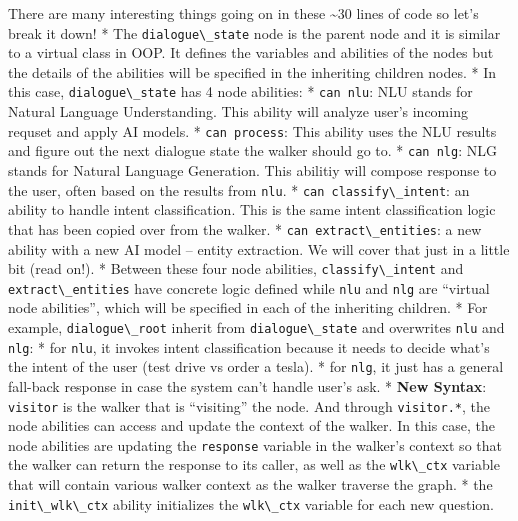 There are many interesting things going on in these \textasciitilde30
lines of code so let's break it down! * The
\passthrough{\lstinline!dialogue\_state!} node is the parent node and it
is similar to a virtual class in OOP. It defines the variables and
abilities of the nodes but the details of the abilities will be
specified in the inheriting children nodes. * In this case,
\passthrough{\lstinline!dialogue\_state!} has 4 node abilities: *
\passthrough{\lstinline!can nlu!}: NLU stands for Natural Language
Understanding. This ability will analyze user's incoming requset and
apply AI models. * \passthrough{\lstinline!can process!}: This ability
uses the NLU results and figure out the next dialogue state the walker
should go to. * \passthrough{\lstinline!can nlg!}: NLG stands for
Natural Language Generation. This abilitiy will compose response to the
user, often based on the results from \passthrough{\lstinline!nlu!}. *
\passthrough{\lstinline!can classify\_intent!}: an ability to handle
intent classification. This is the same intent classification logic that
has been copied over from the walker. *
\passthrough{\lstinline!can extract\_entities!}: a new ability with a
new AI model -- entity extraction. We will cover that just in a little
bit (read on!). * Between these four node abilities,
\passthrough{\lstinline!classify\_intent!} and
\passthrough{\lstinline!extract\_entities!} have concrete logic defined
while \passthrough{\lstinline!nlu!} and \passthrough{\lstinline!nlg!}
are ``virtual node abilities'', which will be specified in each of the
inheriting children. * For example,
\passthrough{\lstinline!dialogue\_root!} inherit from
\passthrough{\lstinline!dialogue\_state!} and overwrites
\passthrough{\lstinline!nlu!} and \passthrough{\lstinline!nlg!}: * for
\passthrough{\lstinline!nlu!}, it invokes intent classification because
it needs to decide what's the intent of the user (test drive vs order a
tesla). * for \passthrough{\lstinline!nlg!}, it just has a general
fall-back response in case the system can't handle user's ask. *
\textbf{New Syntax}: \passthrough{\lstinline!visitor!} is the walker
that is ``visiting'' the node. And through
\passthrough{\lstinline!visitor.*!}, the node abilities can access and
update the context of the walker. In this case, the node abilities are
updating the \passthrough{\lstinline!response!} variable in the walker's
context so that the walker can return the response to its caller, as
well as the \passthrough{\lstinline!wlk\_ctx!} variable that will
contain various walker context as the walker traverse the graph. * the
\passthrough{\lstinline!init\_wlk\_ctx!} ability initializes the
\passthrough{\lstinline!wlk\_ctx!} variable for each new question.


